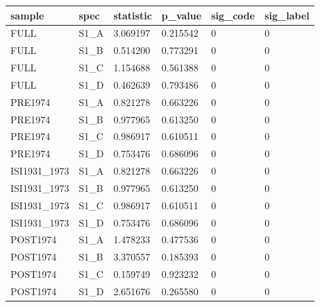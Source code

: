 \begin{tabular}{llllll}
\hline
sample & spec & statistic & p\_value & sig\_code & sig\_label \\
\hline
FULL & S1\_A & 3.069197 & 0.215542 & 0 & 0 \\
FULL & S1\_B & 0.514200 & 0.773291 & 0 & 0 \\
FULL & S1\_C & 1.154688 & 0.561388 & 0 & 0 \\
FULL & S1\_D & 0.462639 & 0.793486 & 0 & 0 \\
PRE1974 & S1\_A & 0.821278 & 0.663226 & 0 & 0 \\
PRE1974 & S1\_B & 0.977965 & 0.613250 & 0 & 0 \\
PRE1974 & S1\_C & 0.986917 & 0.610511 & 0 & 0 \\
PRE1974 & S1\_D & 0.753476 & 0.686096 & 0 & 0 \\
ISI1931\_1973 & S1\_A & 0.821278 & 0.663226 & 0 & 0 \\
ISI1931\_1973 & S1\_B & 0.977965 & 0.613250 & 0 & 0 \\
ISI1931\_1973 & S1\_C & 0.986917 & 0.610511 & 0 & 0 \\
ISI1931\_1973 & S1\_D & 0.753476 & 0.686096 & 0 & 0 \\
POST1974 & S1\_A & 1.478233 & 0.477536 & 0 & 0 \\
POST1974 & S1\_B & 3.370557 & 0.185393 & 0 & 0 \\
POST1974 & S1\_C & 0.159749 & 0.923232 & 0 & 0 \\
POST1974 & S1\_D & 2.651676 & 0.265580 & 0 & 0 \\
\hline
\end{tabular}
